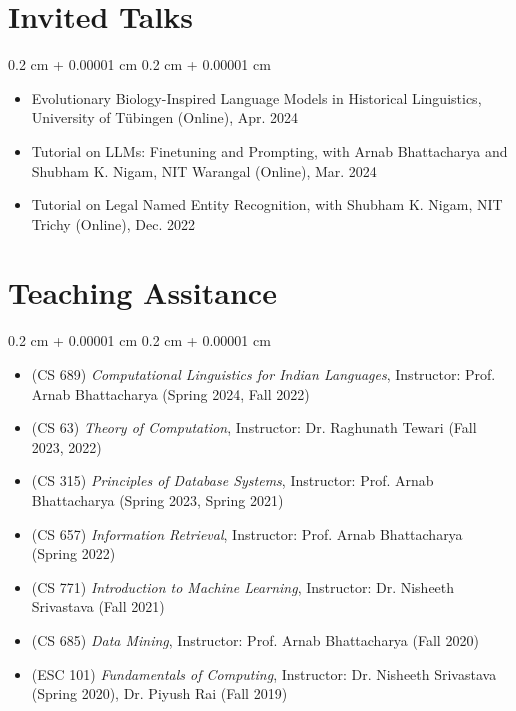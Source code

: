 \documentclass[12pt, letterpaper]{article}
\newenvironment{highlightsforbulletentries}{
    \begin{itemize}[
        topsep=0.10 cm,
        parsep=0.10 cm,
        partopsep=0pt,
        itemsep=0pt,
        leftmargin=10pt
    ]
}{
    \end{itemize}
} %
\newenvironment{onecolentry}{
    \begin{adjustwidth}{
        0.2 cm + 0.00001 cm
    }{
        0.2 cm + 0.00001 cm
    }
}{
    \end{adjustwidth}
} %
\begin{document}
    
    \section{Invited Talks}

    \begin{onecolentry}
        \begin{highlightsforbulletentries}


        \item Evolutionary Biology-Inspired Language Models in Historical Linguistics, University of Tübingen (Online), Apr. 2024

        \item Tutorial on LLMs: Finetuning and Prompting, with Arnab Bhattacharya and Shubham K. Nigam, NIT Warangal (Online), Mar. 2024

        \item Tutorial on Legal Named Entity Recognition, with Shubham K. Nigam, NIT Trichy (Online), Dec. 2022


        \end{highlightsforbulletentries}
    \end{onecolentry}

    \section{Teaching Assitance}

    \begin{onecolentry}
        \begin{highlightsforbulletentries}


        \item (CS 689) \textit{Computational Linguistics for Indian Languages}, Instructor: Prof. Arnab Bhattacharya (Spring 2024, Fall 2022)

        \item (CS 63) \textit{Theory of Computation}, Instructor: Dr. Raghunath Tewari (Fall 2023, 2022)

        \item (CS 315) \textit{Principles of Database Systems}, Instructor: Prof. Arnab Bhattacharya (Spring 2023, Spring 2021)

        \item (CS 657) \textit{Information Retrieval}, Instructor: Prof. Arnab Bhattacharya (Spring 2022)

        \item (CS 771) \textit{Introduction to Machine Learning}, Instructor: Dr. Nisheeth Srivastava (Fall 2021)

        \item (CS 685) \textit{Data Mining}, Instructor: Prof. Arnab Bhattacharya (Fall 2020)

        \item (ESC 101) \textit{Fundamentals of Computing}, Instructor: Dr. Nisheeth Srivastava (Spring 2020), Dr. Piyush Rai (Fall 2019)


        \end{highlightsforbulletentries}
    \end{onecolentry}
\end{document}
